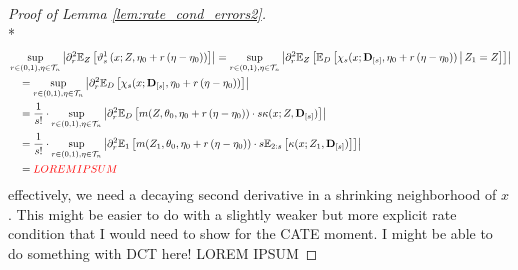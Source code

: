 \begin{proof}[Proof of Lemma \ref{lem:rate_cond_errors2}]\mbox{}\\*
    \begin{equation}
        \begin{aligned}
            & \sup_{r \in(0,1), \eta \in \mathcal{T}_{n}}\left|
                \partial_r^2 \mathbb{E}_{Z}\left[
                    \vartheta_{s}^{1}\left(x; Z, \eta_{0} + r\left(\eta-\eta_{0}\right)\right)
                \right]
            \right| 
            = \sup_{r \in(0,1), \eta \in \mathcal{T}_{n}}\left|
                \partial_r^2 \mathbb{E}_{Z}\left[
                    \mathbb{E}_{D}\left[\chi_{s}(x; \mathbf{D}_{[s]}, \eta_{0} + r\left(\eta-\eta_{0}\right)) \, \middle| \, Z_1 = Z\right]
                \right]
            \right| \\
            & \quad = \sup_{r \in(0,1), \eta \in \mathcal{T}_{n}}\left|
                \partial_r^2 \mathbb{E}_{D}\left[\chi_{s}(x; \mathbf{D}_{[s]}, \eta_{0} + r\left(\eta-\eta_{0}\right))\right]
            \right| \\
            & \quad = \frac{1}{s!} \cdot \sup_{r \in(0,1), \eta \in \mathcal{T}_{n}}\left|
                \partial_r^2  \mathbb{E}_{D}\left[
                    m(Z, \theta_{0}, \eta_{0} + r\left(\eta-\eta_{0}\right)) \cdot s \kappa(x; Z, \mathbf{D}_{[s]})
                \right]
            \right| \\
            & \quad = \frac{1}{s!} \cdot \sup_{r \in(0,1), \eta \in \mathcal{T}_{n}}\left|
                \partial_r^2  \mathbb{E}_{1}\left[
                    m(Z_1, \theta_{0}, \eta_{0} + r\left(\eta-\eta_{0}\right)) \cdot s \mathbb{E}_{2:s}\left[\kappa(x; Z_{1}, \mathbf{D}_{[s]})\right]
                \right]
            \right| \\
            & \quad = {\color{red} LOREM IPSUM}
        \end{aligned}
    \end{equation}
    {\color{blue} effectively, we need a decaying second derivative in a shrinking neighborhood of $x$.
    This might be easier to do with a slightly weaker but more explicit rate condition that I would need to show for the CATE moment.
    I might be able to do something with DCT here!}
    {\color{red} LOREM IPSUM}
\end{proof}